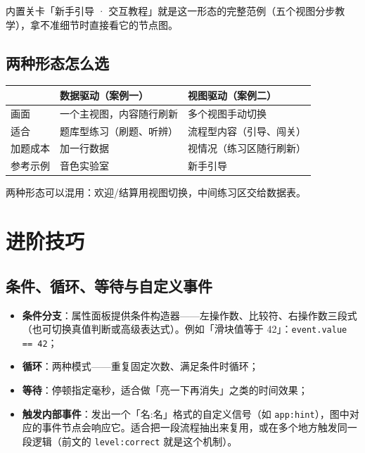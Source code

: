\documentclass[UTF8,a4paper,zihao=-4]{ctexart}
\newcommand{\code}[1]{\texttt{#1}}   %
\begin{document}
内置关卡「新手引导 · 交互教程」就是这一形态的完整范例（五个视图分步教学），拿不准细节时直接看它的节点图。

\subsection{两种形态怎么选}

\begin{center}
\begin{tabular}{lll}
\toprule
 & 数据驱动（案例一） & 视图驱动（案例二） \\
\midrule
画面 & 一个主视图，内容随行刷新 & 多个视图手动切换 \\
适合 & 题库型练习（刷题、听辨） & 流程型内容（引导、闯关） \\
加题成本 & 加一行数据 & 视情况（练习区随行刷新） \\
参考示例 & 音色实验室 & 新手引导 \\
\bottomrule
\end{tabular}
\end{center}

两种形态可以混用：欢迎/结算用视图切换，中间练习区交给数据表。

\section{进阶技巧}

\subsection{条件、循环、等待与自定义事件}

\begin{itemize}[nosep]
  \item \textbf{条件分支}：属性面板提供条件构造器——左操作数、比较符、右操作数三段式（也可切换真值判断或高级表达式）。例如「滑块值等于 42」：\code{event.value == 42}；
  \item \textbf{循环}：两种模式——重复固定次数、满足条件时循环；
  \item \textbf{等待}：停顿指定毫秒，适合做「亮一下再消失」之类的时间效果；
  \item \textbf{触发内部事件}：发出一个「名:名」格式的自定义信号（如 \code{app:hint}），图中对应的事件节点会响应它。适合把一段流程抽出来复用，或在多个地方触发同一段逻辑（前文的 \code{level:correct} 就是这个机制）。
\end{itemize}
\end{document}
